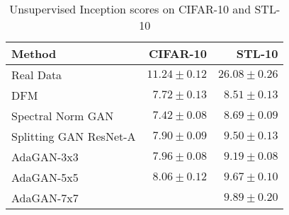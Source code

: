 \documentclass{article} %
\begin{document}
\begin{table}[t]
\caption{Unsupervised Inception scores on CIFAR-10 and STL-10}
\label{table:experiment-compare}
\begin{center}
\begin{tabular}{l|r|r}
Method                                      & CIFAR-10                 & STL-10                   \\ \hline \hline
Real Data \citep{warde2016improving}        & $11.24 \pm 0.12$         & $26.08 \pm 0.26$         \\
DFM \citep{warde2016improving}              & $7.72 \pm 0.13$          & $8.51 \pm 0.13$          \\
Spectral Norm GAN \cite{miyato2017spectral} & $7.42 \pm 0.08$          & $8.69 \pm 0.09$          \\
Splitting GAN ResNet-A \cite{1709.07359}    & $7.90 \pm 0.09$          & $9.50 \pm 0.13$          \\ \hline
AdaGAN-3x3                                  & $7.96 \pm 0.08$          & $9.19 \pm 0.08$          \\
AdaGAN-5x5                                  & $\mathbf{8.06 \pm 0.12}$ & $9.67 \pm 0.10$ \\
AdaGAN-7x7                                  &                          & $\mathbf{9.89 \pm 0.20}$
\end{tabular}
\end{center}
\end{table}
\end{document}
